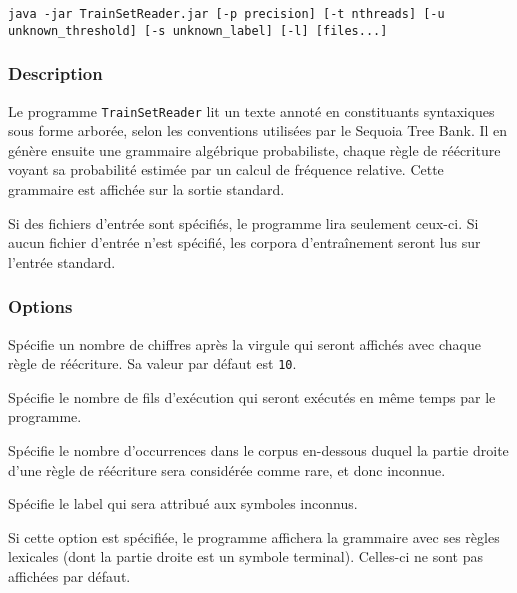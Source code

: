 \documentclass[12pt]{article}
\begin{document}
{\ttfamily
\begin{verbatim}
java -jar TrainSetReader.jar [-p precision] [-t nthreads] [-u
unknown_threshold] [-s unknown_label] [-l] [files...]
\end{verbatim}
}

\subsubsection{Description}

Le programme \texttt{TrainSetReader} lit un texte annot\'e en constituants
syntaxiques sous forme arbor\'ee, selon les conventions utilis\'ees par le Sequoia Tree Bank. Il en
g\'en\`ere ensuite une grammaire alg\'ebrique probabiliste, chaque r\`egle de r\'e\'ecriture
voyant sa probabilit\'e estim\'ee par un calcul de fr\'equence relative. Cette
grammaire est affich\'ee sur la sortie standard.

Si des fichiers d'entr\'ee sont sp\'ecifi\'es, le programme lira seulement ceux-ci. Si
aucun fichier d'entr\'ee n'est sp\'ecifi\'e, les corpora d'entra\^inement seront lus sur
l'entr\'ee standard.

\subsubsection{Options}

\begin{description}[style=nextline]
\item[\texttt{-p, --precision precision}] Sp\'ecifie un nombre de chiffres apr\`es
la virgule qui seront affich\'es avec chaque r\`egle de r\'e\'ecriture. Sa valeur par d\'efaut est
\texttt{10}.
\item[\texttt{-t, --nthreads threads}] Sp\'ecifie le nombre de fils d'ex\'ecution
qui seront ex\'ecut\'es en m\^eme temps par le programme.
\item[\texttt{-u, --unknown-threshold unknown\_threshold}] Sp\'ecifie le nombre
d'occurrences dans le corpus en-dessous duquel la partie droite d'une r\`egle de
r\'e\'ecriture sera consid\'er\'ee comme rare, et donc inconnue.
\item[\texttt{-s, --unknown-label unknown\_label}] Sp\'ecifie le label qui sera
attribu\'e aux symboles inconnus.
\item[\texttt{-l, --lexical}] Si cette option est sp\'ecifi\'ee, le programme
affichera la grammaire avec ses r\`egles lexicales (dont la partie droite est un
symbole terminal). Celles-ci ne sont pas affich\'ees par d\'efaut.
\end{description}
\end{document}
